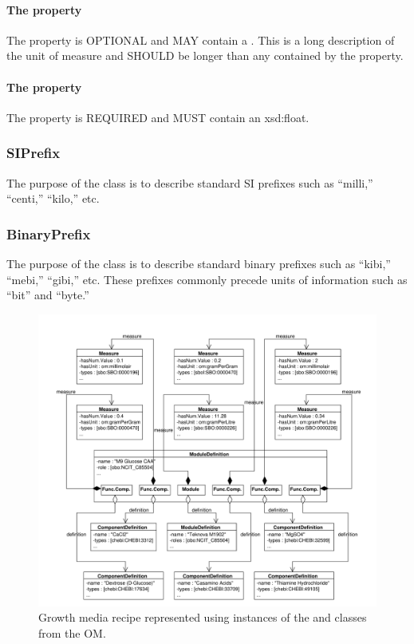 \paragraph{The  property}\label{sec:longcomment:Prefix}
The  property is OPTIONAL and MAY contain a . This  is a long description of the unit of measure and SHOULD be longer than any  contained by the  property.

\paragraph{The  property}\label{sec:hasFactor:Prefix}
The  property is REQUIRED and MUST contain an xsd:float.

\subsubsection{SIPrefix}
\label{sec:SIPrefix}

The purpose of the  class is to describe standard SI prefixes such as ``milli,'' ``centi,'' ``kilo,'' etc. 


\subsubsection{BinaryPrefix}
\label{sec:BinaryPrefix}

The purpose of the  class is to describe standard binary prefixes such as ``kibi,'' ``mebi,'' ``gibi,'' etc. These prefixes commonly precede units of information such as ``bit'' and ``byte.''

\begin{figure}[ht]
\begin{center}
\includegraphics[width=\linewidth]{uml/media_example}
\caption[]{Growth media recipe represented using instances of the  and  classes from the OM.}
\label{uml:media_example}
\end{center}
\end{figure}
